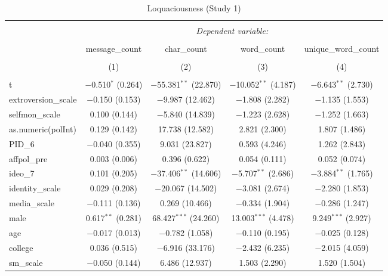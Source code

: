 
\begin{table}[H] \centering 
  \caption{Loquaciousness (Study 1)} 
  \label{tab:s1_loquaciousness} 
\begin{tabular}{@{\extracolsep{5pt}}lcccc} 
\\[-1.8ex]\hline 
\hline \\[-1.8ex] 
 & \multicolumn{4}{c}{\textit{Dependent variable:}} \\ 
\cline{2-5} 
\\[-1.8ex] & message\_count & char\_count & word\_count & unique\_word\_count \\ 
\\[-1.8ex] & (1) & (2) & (3) & (4)\\ 
\hline \\[-1.8ex] 
 t & $-$0.510$^{*}$ (0.264) & $-$55.381$^{**}$ (22.870) & $-$10.052$^{**}$ (4.187) & $-$6.643$^{**}$ (2.730) \\ 
  extroversion\_scale & $-$0.150 (0.153) & $-$9.987 (12.462) & $-$1.808 (2.282) & $-$1.135 (1.553) \\ 
  selfmon\_scale & 0.100 (0.144) & $-$5.840 (14.839) & $-$1.223 (2.628) & $-$1.252 (1.663) \\ 
  as.numeric(polInt) & 0.129 (0.142) & 17.738 (12.582) & 2.821 (2.300) & 1.807 (1.486) \\ 
  PID\_6 & $-$0.040 (0.355) & 9.031 (23.827) & 0.593 (4.246) & 1.262 (2.843) \\ 
  affpol\_pre & 0.003 (0.006) & 0.396 (0.622) & 0.054 (0.111) & 0.052 (0.074) \\ 
  ideo\_7 & 0.101 (0.205) & $-$37.406$^{**}$ (14.606) & $-$5.707$^{**}$ (2.686) & $-$3.884$^{**}$ (1.765) \\ 
  identity\_scale & 0.029 (0.208) & $-$20.067 (14.502) & $-$3.081 (2.674) & $-$2.280 (1.853) \\ 
  media\_scale & $-$0.111 (0.136) & 0.269 (10.466) & $-$0.334 (1.904) & $-$0.286 (1.247) \\ 
  male & 0.617$^{**}$ (0.281) & 68.427$^{***}$ (24.260) & 13.003$^{***}$ (4.478) & 9.249$^{***}$ (2.927) \\ 
  age & $-$0.017 (0.013) & $-$0.782 (1.058) & $-$0.110 (0.195) & $-$0.025 (0.128) \\ 
  college & 0.036 (0.515) & $-$6.916 (33.176) & $-$2.432 (6.235) & $-$2.015 (4.059) \\ 
  sm\_scale & $-$0.050 (0.144) & 6.486 (12.937) & 1.503 (2.290) & 1.520 (1.504) \\ 

\end{tabular}
\end{table}
